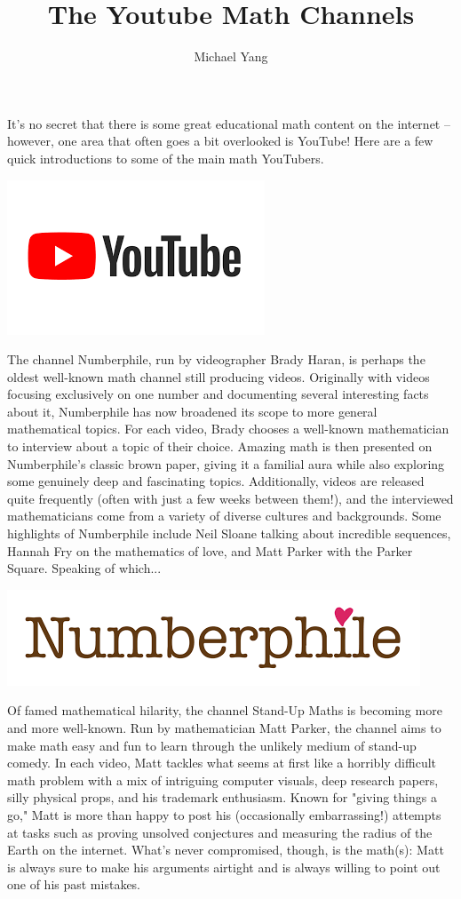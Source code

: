 \documentclass{article}
\title{The Youtube Math Channels}
\author{Michael Yang}
\begin{document}
\maketitle
It's no secret that there is some great educational math content on the internet -- however, one area that often goes a bit overlooked is YouTube! Here are a few quick introductions to some of the main math YouTubers. 
\begin{center}
\includegraphics[scale=0.35]{images/youtube.2022.12.png}
\end{center}
The channel Numberphile, run by videographer Brady Haran, is perhaps the oldest well-known math channel still producing videos. Originally with videos focusing exclusively on one number and documenting several interesting facts about it, Numberphile has now broadened its scope to more general mathematical topics. For each video, Brady chooses a well-known mathematician to interview about a topic of their choice. Amazing math is then presented on Numberphile's classic brown paper, giving it a familial aura while also exploring some genuinely deep and fascinating topics. Additionally, videos are released quite frequently (often with just a few weeks between them!), and the interviewed mathematicians come from a variety of diverse cultures and backgrounds. Some highlights of Numberphile include Neil Sloane talking about incredible sequences, Hannah Fry on the mathematics of love, and Matt Parker with the Parker Square. Speaking of which... 
\begin{center}
\includegraphics[scale=0.35]{images/numberphile.png}
\end{center}
Of famed mathematical hilarity, the channel Stand-Up Maths is becoming more and more well-known. Run by mathematician Matt Parker, the channel aims to make math easy and fun to learn through the unlikely medium of stand-up comedy. In each video, Matt tackles what seems at first like a horribly difficult math problem with a mix of intriguing computer visuals, deep research papers, silly physical props, and his trademark enthusiasm. Known for "giving things a go," Matt is more than happy to post his (occasionally embarrassing!) attempts at tasks such as proving unsolved conjectures and measuring the radius of the Earth on the internet. What's never compromised, though, is the math(s): Matt is always sure to make his arguments airtight and is always willing to point out one of his past mistakes. 
\end{document}
